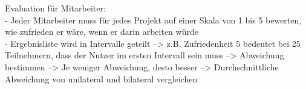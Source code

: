 Evaluation für Mitarbeiter:\\
- Jeder Mitarbeiter muss für jedes Projekt auf einer Skala von 1 bis 5 bewerten, wie zufrieden er wäre, wenn er darin arbeiten würde\\
- Ergebnisliste wird in Intervalle geteilt --> z.B. Zufriedenheit 5 bedeutet bei 25 Teilnehmern, dass der Nutzer im ersten Intervall sein muss --> Abweichung bestimmen --> Je weniger Abweichung, desto besser --> Durchschnittliche Abweichung von unilateral und bilateral vergleichen
